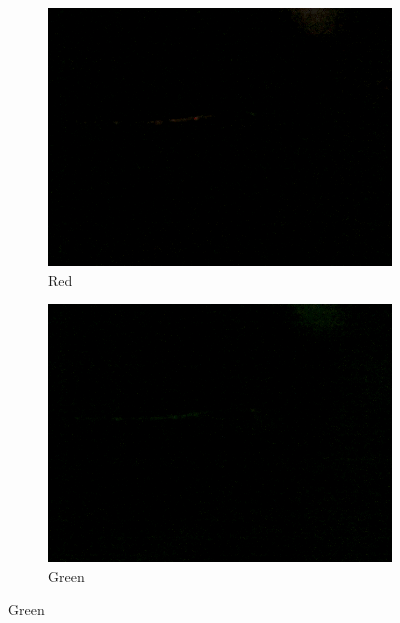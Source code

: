 			\begin{figure}
				\begin{subfigure}{0.24\textwidth}
					\includegraphics[width=\linewidth, keepaspectratio=true]{./fig/Vision/Dataset/automated_datasets/2_created_datasets/1_Birthday_dataset/b_003_p_005_b_l_006_red_A.png}
					\caption{Red}
				\end{subfigure}
				\hspace*{\fill}
				\begin{subfigure}{0.24\textwidth}
					\includegraphics[width=\linewidth, keepaspectratio=true]{./fig/Vision/Dataset/automated_datasets/2_created_datasets/1_Birthday_dataset/b_003_p_005_b_l_006_green_A.png}
					\caption{Green}
				\end{subfigure}

\end{figure}
